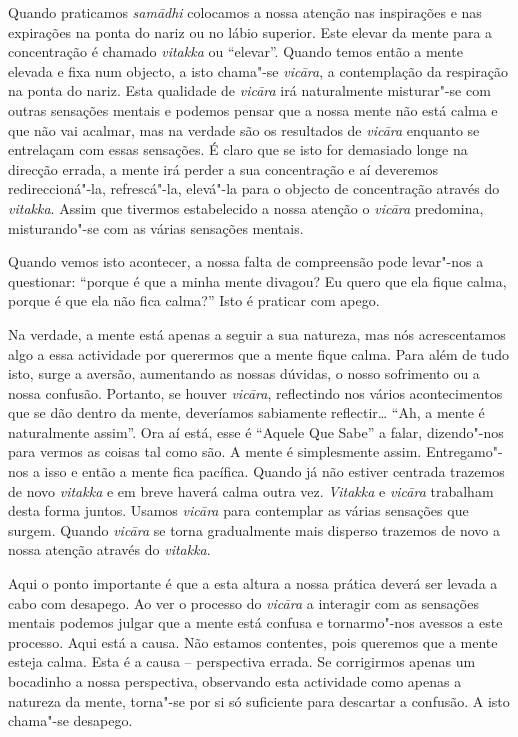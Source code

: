 Quando praticamos \emph{samādhi} colocamos a nossa atenção nas
inspirações e nas expirações na ponta do nariz ou no lábio superior.
Este elevar da mente para a concentração é chamado \emph{vitakka} ou
``elevar''. Quando temos então a mente elevada e fixa num objecto, a
isto chama"-se \emph{vicāra}, a contemplação da respiração na ponta do
nariz. Esta qualidade de \emph{vicāra} irá naturalmente misturar"-se com
outras sensações mentais e podemos pensar que a nossa mente não está
calma e que não vai acalmar, mas na verdade são os resultados de
\emph{vicāra} enquanto se entrelaçam com essas sensações. É claro que se
isto for demasiado longe na direcção errada, a mente irá perder a sua
concentração e aí deveremos redireccioná"-la, refrescá"-la, elevá"-la para
o objecto de concentração através do \emph{vitakka}. Assim que tivermos
estabelecido a nossa atenção o \emph{vicāra} predomina, misturando"-se
com as várias sensações mentais.

Quando vemos isto acontecer, a nossa falta de compreensão pode levar"-nos
a questionar: ``porque é que a minha mente divagou? Eu quero que ela
fique calma, porque é que ela não fica calma?'' Isto é praticar com
apego.

Na verdade, a mente está apenas a seguir a sua natureza, mas nós
acrescentamos algo a essa actividade por querermos que a mente fique
calma. Para além de tudo isto, surge a aversão, aumentando as nossas
dúvidas, o nosso sofrimento ou a nossa confusão. Portanto, se houver
\emph{vicāra}, reflectindo nos vários acontecimentos que se dão dentro
da mente, deveríamos sabiamente reflectir\ldots{} ``Ah, a mente é
naturalmente assim''. Ora aí está, esse é ``Aquele Que Sabe'' a falar,
dizendo"-nos para vermos as coisas tal como são. A mente é simplesmente
assim. Entregamo"-nos a isso e então a mente fica pacífica. Quando já não
estiver centrada trazemos de novo \emph{vitakka} e em breve haverá calma
outra vez. \emph{Vitakka} e \emph{vicāra} trabalham desta forma juntos.
Usamos \emph{vicāra} para contemplar as várias sensações que surgem.
Quando \emph{vicāra} se torna gradualmente mais disperso trazemos de
novo a nossa atenção através do \emph{vitakka}.

Aqui o ponto importante é que a esta altura a nossa prática deverá ser
levada a cabo com desapego. Ao ver o processo do \emph{vicāra} a
interagir com as sensações mentais podemos julgar que a mente está
confusa e tornarmo"-nos avessos a este processo. Aqui está a causa. Não
estamos contentes, pois queremos que a mente esteja calma. Esta é a
causa -- perspectiva errada. Se corrigirmos apenas um bocadinho a nossa
perspectiva, observando esta actividade como apenas a natureza da mente,
torna"-se por si só suficiente para descartar a confusão. A isto chama"-se
desapego.

